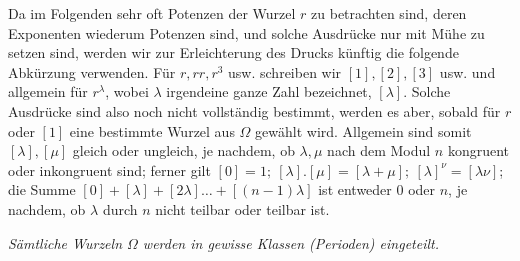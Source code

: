 Da im Folgenden sehr oft Potenzen der Wurzel \(r\) zu betrachten sind, deren Exponenten wiederum Potenzen sind, und solche Ausdrücke nur mit Mühe zu setzen sind, werden wir zur Erleichterung des Drucks künftig
die folgende Abkürzung verwenden. Für \(r,\allowbreak rr,\allowbreak r^3\) usw. schreiben wir \([1],\allowbreak [2],\allowbreak [3]\) usw. und allgemein für \(r^\lambda\), wobei \(\lambda\) irgendeine ganze Zahl bezeichnet, \([\lambda]\). Solche Ausdrücke sind also noch nicht vollständig bestimmt, werden es aber, sobald für \(r\) oder \([1]\) eine bestimmte Wurzel aus \(\Omega\) gewählt wird. Allgemein sind somit \([\lambda],\allowbreak [\mu]\) gleich oder ungleich, je nachdem, ob \(\lambda,\allowbreak \mu\) nach dem Modul \(n\) kongruent oder inkongruent sind; ferner gilt \([0]=1;\allowbreak \ [\lambda].[\mu]=[\lambda+\mu];\allowbreak \ [\lambda]^\nu=[\lambda\nu]\); die Summe \([0]+[\lambda]+[2\lambda]\ldots+[(n-1)\lambda]\) ist entweder \(0\) oder \(n\), je nachdem, ob \(\lambda\) durch \(n\) nicht teilbar oder teilbar ist.

\begin{center}\textit{Sämtliche Wurzeln \(\Omega\) werden in gewisse Klassen (Perioden) eingeteilt.}\end{center}


